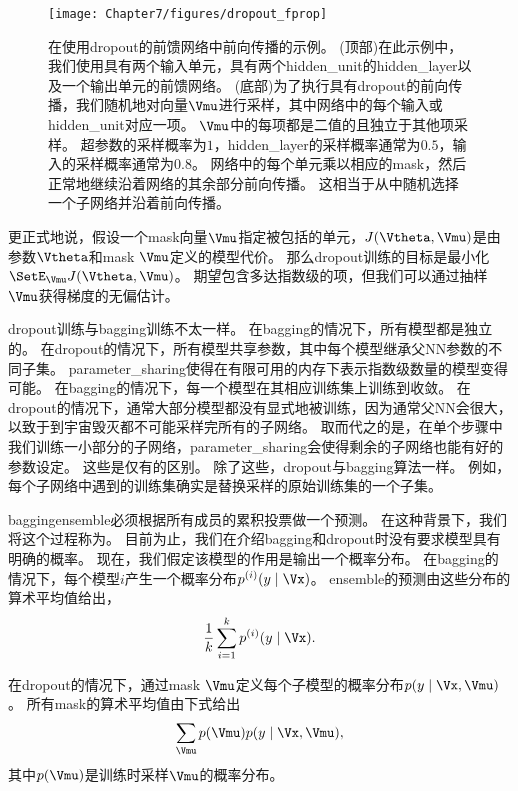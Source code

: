 \begin{figure}[!htb]
\else
\centerline{\texttt{[image: Chapter7/figures/dropout\_fprop]}}
\fi
\caption{在使用\gls{dropout}的前馈网络中前向传播的示例。
(顶部)在此示例中，我们使用具有两个输入单元，具有两个\gls{hidden_unit}的\gls{hidden_layer}以及一个输出单元的前馈网络。
(底部)为了执行具有\gls{dropout}的前向传播，我们随机地对向量$\Vmu$进行采样，其中网络中的每个输入或\gls{hidden_unit}对应一项。
$\Vmu$中的每项都是二值的且独立于其他项采样。
超参数的采样概率为$1$，\gls{hidden_layer}的采样概率通常为$0.5$，输入的采样概率通常为$0.8$。
网络中的每个单元乘以相应的\gls{mask}，然后正常地继续沿着网络的其余部分前向传播。
这相当于从中随机选择一个子网络并沿着前向传播。
}
\label{fig:chap7_dropout_fprop}
\end{figure}

更正式地说，假设一个\gls{mask}向量$\Vmu$指定被包括的单元，$J(\Vtheta, \Vmu)$是由参数$\Vtheta$和\gls{mask} $\Vmu$定义的模型代价。
那么\gls{dropout}训练的目标是最小化$\SetE_{\Vmu} J(\Vtheta, \Vmu)$。 
期望包含多达指数级的项，但我们可以通过抽样$\Vmu$获得梯度的无偏估计。

\gls{dropout}训练与\gls{bagging}训练不太一样。
在\gls{bagging}的情况下，所有模型都是独立的。
在\gls{dropout}的情况下，所有模型共享参数，其中每个模型继承父\gls{NN}参数的不同子集。
\gls{parameter_sharing}使得在有限可用的内存下表示指数级数量的模型变得可能。
在\gls{bagging}的情况下，每一个模型在其相应训练集上训练到收敛。
在\gls{dropout}的情况下，通常大部分模型都没有显式地被训练，因为通常父\gls{NN}会很大，以致于到宇宙毁灭都不可能采样完所有的子网络。
取而代之的是，在单个步骤中我们训练一小部分的子网络，\gls{parameter_sharing}会使得剩余的子网络也能有好的参数设定。
这些是仅有的区别。
除了这些，\gls{dropout}与\gls{bagging}算法一样。
例如，每个子网络中遇到的训练集确实是替换采样的原始训练集的一个子集。

\gls{bagging}\gls{ensemble}必须根据所有成员的累积投票做一个预测。
在这种背景下，我们将这个过程称为。
目前为止，我们在介绍\gls{bagging}和\gls{dropout}时没有要求模型具有明确的概率。
现在，我们假定该模型的作用是输出一个概率分布。
在\gls{bagging}的情况下，每个模型$i$产生一个概率分布$p^{(i)}(y \mid \Vx)$。 
\gls{ensemble}的预测由这些分布的算术平均值给出，
\begin{align}
 \frac{1}{k} \sum_{i=1}^k p^{(i)}(y \mid \Vx).
\end{align}

在\gls{dropout}的情况下，通过\gls{mask} $\Vmu$定义每个子模型的概率分布$p(y \mid \Vx, \Vmu)$。
所有\gls{mask}的算术平均值由下式给出
\begin{align}
  \sum_{\Vmu} p(\Vmu) p(y \mid \Vx, \Vmu),
\end{align}
其中$p(\Vmu)$是训练时采样$\Vmu$的概率分布。

